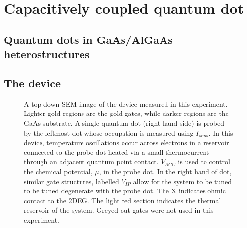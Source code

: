 
\chapter{Capacitively coupled quantum dot}
\label{ch:Methods}
\section{Quantum dots in GaAs/AlGaAs heterostructures}
\label{sec:qds}

\section{The device}
\label{sec:device}
\begin{figure}[h]
\centering
{}
\caption{ A top-down SEM image of the device measured in this experiment. Lighter gold regions are the gold gates, while darker regions are the GaAs substrate. A single quantum dot (right hand side) is probed by the leftmost dot whose occupation is measured using $I_{sens}$. In this device, temperature oscillations occur across electrons in a reservoir connected to the probe dot heated via a small thermocurrent through an adjacent quantum point contact. $V_{ACC}$ is used to control the chemical potential, $\mu$, in the probe dot. In the right hand of dot, similar gate structures, labelled $V_{IP}$ allow for the system to be tuned to be tuned degenerate with the probe dot. The X indicates ohmic contact to the 2DEG. The light red section indicates the thermal reservoir of the system. Greyed out gates were not used in this experiment.}
\label{fig:device}       %
\end{figure}

